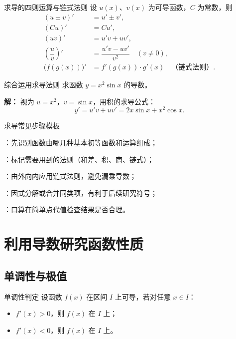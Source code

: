 \documentclass[a4paper,11pt]{ctexart}
\begin{document}
\begin{theorembox}{求导的四则运算与链式法则}
设 $u(x)$、$v(x)$ 为可导函数，$C$ 为常数，则
\begin{align*}
  (u\pm v)' &= u'\pm v',\\
  (Cu)' &= Cu',\\
  (uv)' &= u'v+uv',\\
  \left(\dfrac{u}{v}\right)' &= \dfrac{u'v-uv'}{v^2}\quad (v\ne 0),\\
  \bigl(f(g(x))\bigr)' &= f'(g(x))\cdot g'(x)\quad\text{（链式法则）}.
\end{align*}
\end{theorembox}

\begin{examplebox}{综合运用求导法则}
求函数 $y=x^2\sin x$ 的导数。

\textbf{解：} 视为 $u=x^2$，$v=\sin x$，用积的求导公式：
\[
  y' = u'v+uv' = 2x\sin x + x^2\cos x.
\]
\end{examplebox}

\begin{notebox}{求导常见步骤模板}
\begin{focuspoints}
  \item {}：先识别函数由哪几种基本初等函数和运算组成；
  \item {}：标记需要用到的法则（和差、积、商、链式）；
  \item {}：由外向内应用链式法则，避免漏乘导数；
  \item {}：因式分解或合并同类项，有利于后续研究符号；
  \item {}：口算在简单点代值检查结果是否合理。
\end{focuspoints}
\end{notebox}

\section{利用导数研究函数性质}

\subsection{单调性与极值}

\begin{definitionbox}{单调性判定}
设函数 $f(x)$ 在区间 $I$ 上可导，若对任意 $x\in I$：
\begin{itemize}
  \item $f'(x)>0$，则 $f(x)$ 在 $I$ 上；
  \item $f'(x)<0$，则 $f(x)$ 在 $I$ 上。
\end{itemize}
\end{definitionbox}
\end{document}
